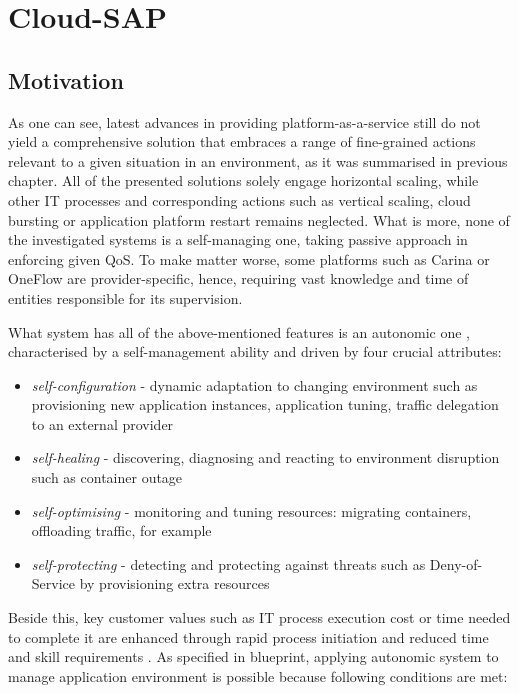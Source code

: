 \chapter{Cloud-SAP}


\section{Motivation}
As one can see, latest advances in providing platform-as-a-service still do not yield a comprehensive solution that embraces a range of fine-grained actions relevant to a given situation in an environment, as it was summarised in previous chapter. All of the presented solutions solely engage horizontal scaling, while other IT processes and corresponding actions such as vertical scaling, cloud bursting or application platform restart remains neglected. What is more, none of the investigated systems is a self-managing one, taking passive approach in enforcing given QoS. To make matter worse, some platforms such as Carina or OneFlow are provider-specific, hence, requiring vast knowledge and time of entities responsible for its supervision.

What system has all of the above-mentioned features is an autonomic one \cite{IBM06}, characterised by a self-management ability and driven by four crucial attributes:
\begin{itemize}
 \item \emph{self-configuration} - dynamic adaptation to changing environment such as provisioning new application instances, application tuning, traffic delegation to an external provider
  \item \emph{self-healing} - discovering, diagnosing and reacting to environment disruption such as container outage
  \item \emph{self-optimising} - monitoring and tuning resources: migrating containers, offloading traffic, for example
  \item \emph{self-protecting} - detecting and protecting against threats such as Deny-of-Service by provisioning extra resources
\end{itemize}

Beside this, key customer values such as IT process execution cost or time needed to complete it are enhanced through rapid process initiation and reduced time and skill requirements \cite{IBM06}. As specified in blueprint, applying autonomic system to manage application environment is possible because following conditions are met:

